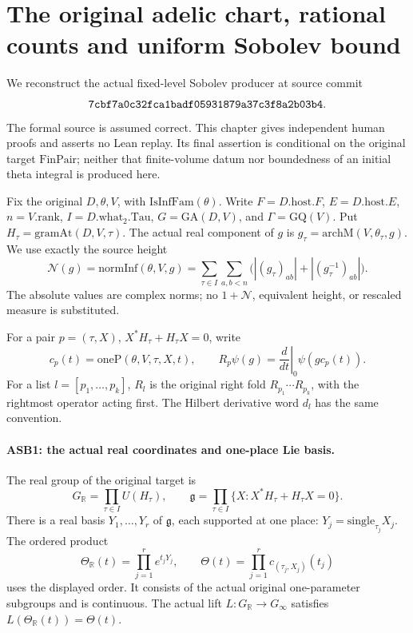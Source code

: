 \section{The original adelic chart, rational counts and uniform Sobolev bound}
\label{sec:adelic-sobolev}

We reconstruct the actual fixed-level Sobolev producer at source commit
\[
 \text{\ttfamily 7cbf7a0c32fca1badf05931879a37c3f8a2b03b4}.
\]
The formal source is assumed correct.  This chapter gives independent
human proofs and asserts no Lean replay.
Its final assertion is conditional on the original target
\(\mathrm{FinPair}\); neither that finite-volume datum nor boundedness
of an initial theta integral is produced here.

Fix the original \(D,\theta,V\), with \(\mathrm{IsInfFam}(\theta)\).
Write \(F=D.\mathrm{host}.F\), \(E=D.\mathrm{host}.E\),
\(n=V.\mathrm{rank}\), \(I=D.\mathrm{what}_2.\mathrm{Tau}\),
\(G=\mathrm{GA}(D,V)\), and \(\Gamma=\mathrm{GQ}(V)\).
Put \(H_\tau=\mathrm{gramAt}(D,V,\tau)\).
The actual real component of \(g\) is \(g_\tau=\mathrm{archM}(V,\theta_\tau,g)\).
We use exactly the source height
\[
 \mathcal N(g)=\mathrm{normInf}(\theta,V,g)
   =\sum_{\tau\in I}\sum_{a,b<n}
       \bigl(|(g_\tau)_{ab}|+|(g_\tau^{-1})_{ab}|\bigr).
 \tag{ASB.1}
\]
The absolute values are complex norms; no \(1+\mathcal N\), equivalent
height, or rescaled measure is substituted.

For a pair \(p=(\tau,X)\), \(X^*H_\tau+H_\tau X=0\), write
\[
 c_p(t)=\mathrm{oneP}(\theta,V,\tau,X,t),\qquad
 R_p\psi(g)=\left.\frac{d}{dt}\right|_{0}\psi(gc_p(t)).
 \tag{ASB.2}
\]
For a list \(l=[p_1,\ldots,p_k]\), \(R_l\) is the original right fold
\(R_{p_1}\cdots R_{p_k}\), with the rightmost operator acting first.
The Hilbert derivative word \(d_l\) has the same convention.

\paragraph{ASB1: the actual real coordinates and one-place Lie basis.}
\label{claim:ASB1}
The real group of the original target is
\[
 G_{\mathbb R}=\prod_{\tau\in I}U(H_\tau),\qquad
 \mathfrak g=\prod_{\tau\in I}
       \{X:X^*H_\tau+H_\tau X=0\}.
 \tag{ASB.3}
\]
There is a real basis \(Y_1,\ldots,Y_r\) of \(\mathfrak g\), each
supported at one place: \(Y_j=\mathrm{single}_{\tau_j}X_j\).
The ordered product
\[
 \Theta_{\mathbb R}(t)=\prod_{j=1}^r e^{t_jY_j},
 \qquad
 \Theta(t)=\prod_{j=1}^r c_{(\tau_j,X_j)}(t_j)
 \tag{ASB.4}
\]
uses the displayed order.  It consists of the actual original
one-parameter subgroups and is continuous.  The actual lift
\(L:G_{\mathbb R}\to G_\infty\) satisfies
\(L(\Theta_{\mathbb R}(t))=\Theta(t)\).

